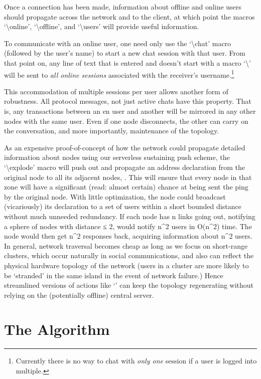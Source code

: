 \documentclass[11pt]{article}
\begin{document}
Once a connection has been made, information about offline and online users should propagate across the network and to the client, at which point the macros `\textbackslash online', `\textbackslash offline', and `\textbackslash users' will provide useful information.

To communicate with an online user, one need only use the `\textbackslash chat' macro (followed by the user's name) to start a new chat session with that user. From that point on, any line of text that is entered and doesn't start with a macro `\textbackslash' will be sent to \emph{all online sessions} associated with the receiver's username.\footnote{Currently there is no way to chat with \emph{only one} session if a user is logged into multiple.}

This accommodation of multiple sessions per user allows another form of robustness. All protocol messages, not just active chats have this property. That is, any transactions between an en user and another will be mirrored in any other nodes with the same user. Even if one node disconnects, the other can carry on the conversation, and more importantly, maintenance of the topology.

As an expensive proof-of-concept of how the network could propagate detailed information about nodes using our serverless sustaining push scheme, the `\textbackslash explode' macro will push out and propagate an address declaration from the original node to all its adjacent nodes, . This will ensure that every node in that zone will have a significant (read: almost certain) chance at being sent the ping by the original node. With little optimization, the node could broadcast (vicariously) its declaration to a set of users within a short bounded distance without much unneeded redundancy. If each node has n links going out, notifying a sphere of nodes with distance ≤ 2, would notify n^2 users in O(n^2) time. The node would then get n^2 responses back, acquiring information about n^2 users. In general, network traversal becomes cheap as long as we focus on short-range clusters, which occur naturally in social communications, and also can reflect the physical hardware topology of the network (users in a cluster are more likely to be `stranded' in the same island in the event of network failure.) Hence streamlined versions of actions like `\explode' can keep the topology regenerating without relying on the (potentially offline) central server.

\section{The Algorithm}
\end{document}
